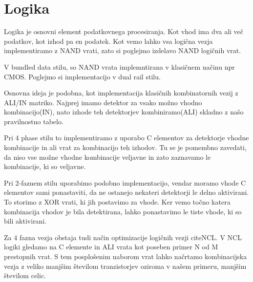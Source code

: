 %
%
%
%

\section{Logika} \label{a}

Logika je osnovni element podatkovnega procesiranja. Kot vhod ima dva ali več podatkov, kot izhod pa en podatek.
Kot vemo lahko vsa logična vezja implementiramo z NAND vrati, zato si poglejmo izdelavo NAND logičnih vrat.

V bundled data stilu, so NAND vrata implemntirana v klasičnem načinu npr CMOS. Poglejmo si implementacijo v dual rail stilu.

Osnovna ideja je podobna, kot implementacija klasičnih kombinatornih vezij z ALI/IN matriko. Najprej imamo detektor za vsako možno vhodno kombinacijo(IN), nato izhode teh detektorjev kombiniramo(ALI) skladno z našo pravilnostno tabelo.

Pri 4 phase stilu to implementiramo z uporabo C elementov za detektorje vhodne kombinacije in ali vrat za kombinacijo teh izhodov. Tu se je pomembno zavedati, da niso vse možne vhodne kombinacije veljavne in zato zaznavamo le kombinacije, ki so veljavne.

Pri 2-faznem stilu uporabimo podobno implementacijo, vendar moramo vhode C elementov sami ponastaviti, da ne ostanejo nekateri detektorji le delno aktivirani. To storimo z XOR vrati, ki jih postavimo za vhode. Ker vemo točno katera kombinacija vhodov je bila detektirana, lahko ponastavimo le tiste vhode, ki so bili aktivirani.

Za 4 fazna vezja obstaja tudi način optimizacije logičnih vezji citeNCL. 
V NCL logiki gledamo na C elemente in ALI vrata kot poseben primer N od M prestopnih vrat. S tem posplošenim naborom vrat lahko načrtamo kombinacijska vezja z veliko manjšim številom tranzistorjev oziroma v našem primeru, manjšim številom celic.








